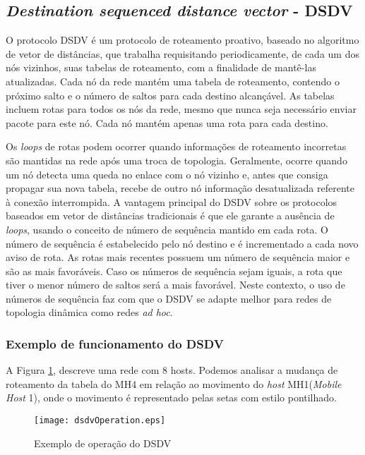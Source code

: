 \subsection{\textit{Destination sequenced distance vector} - DSDV} 
O protocolo DSDV \'e um protocolo de roteamento proativo\cite{gorantala}, baseado no algoritmo de vetor de dist\^ancias, que trabalha requisitando periodicamente, de cada um dos n\'os vizinhos, suas tabelas de roteamento, com a finalidade de mant\^e-las atualizadas. 
Cada n\'o da rede mant\'em uma tabela de roteamento, contendo o pr\'oximo salto e o n\'umero de saltos para cada destino alcan\c{c}\'avel. 
As tabelas incluem rotas para todos os n\'os da rede, mesmo que nunca seja necess\'ario enviar pacote para este n\'o. 
Cada n\'o mant\'em apenas uma rota para cada destino.

Os \textit{loops} de rotas podem ocorrer quando informa\c{c}\~oes de roteamento incorretas s\~ao mantidas na rede ap\'os uma troca de topologia. 
Geralmente, ocorre quando um n\'o detecta uma queda no enlace com o n\'o vizinho e, antes que consiga propagar sua nova tabela, recebe de outro n\'o informa\c{c}\~ao desatualizada referente \`a conex\~ao interrompida. 
A vantagem principal do DSDV sobre os protocolos baseados em vetor de dist\^ancias tradicionais \'e que ele garante a aus\^encia de \textit{loops}, usando o conceito de n\'umero de sequ\^encia mantido em cada rota. 
O n\'umero de sequ\^encia \'e estabelecido pelo n\'o destino e \'e incrementado a cada novo aviso de rota.
As rotas mais recentes possuem um n\'umero de sequ\^encia maior e s\~ao as mais favor\'aveis. 
Caso os n\'umeros de sequ\^encia sejam iguais, a rota que tiver o menor n\'umero de saltos ser\'a a mais favor\'avel. 
Neste contexto, o uso de n\'umeros de sequ\^encia faz com que o DSDV se adapte melhor para redes de topologia din\^amica como redes \textit{ad hoc}.

\subsubsection{Exemplo de funcionamento do DSDV}

A Figura \ref{figOpDSDV}, descreve uma rede com 8 hosts. 
Podemos analisar a mudan\c{c}a de roteamento da tabela do MH4 em rela\c{c}\~ao ao movimento do \textit{host} MH1(\textit{Mobile Host} 1), onde o movimento \'e representado pelas setas com estilo pontilhado. 

\begin{figure}[H]
	\centering
	\texttt{[image: dsdvOperation.eps]}
	\caption{Exemplo de opera\c{c}\~ ao do DSDV}
	\label{figOpDSDV}
\end{figure}

